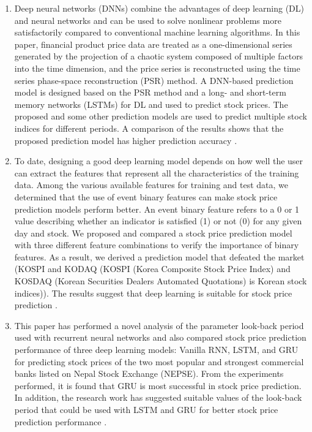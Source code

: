 \documentclass[12pt,journal,compsoc]{IEEEtran}
\begin{document}
\begin{enumerate}
	\item Deep neural networks (DNNs) combine the advantages of deep learning (DL) and neural networks and can be used to solve nonlinear problems more satisfactorily compared to conventional machine learning algorithms. In this paper, financial product price data are treated as a one-dimensional series generated by the projection of a chaotic system composed of multiple factors into the time dimension, and the price series is reconstructed using the time series phase-space reconstruction (PSR) method. A DNN-based prediction model is designed based on the PSR method and a long- and short-term memory networks (LSTMs) for DL and used to predict stock prices. The proposed and some other prediction models are used to predict multiple stock indices for different periods. A comparison of the results shows that the proposed prediction model has higher prediction accuracy \cite{yu2020stock}.
	
	\item To date, designing a good deep learning model depends on how well the user can extract the features that represent all the characteristics of the training data. Among the various available features for training and test data, we determined that the use of event binary features can make stock price prediction models perform better. An event binary feature refers to a 0 or 1 value describing whether an indicator is satisfied (1) or not (0) for any given day and stock. We proposed and compared a stock price prediction model with three different feature combinations to verify the importance of binary features. As a result, we derived a prediction model that defeated the market (KOSPI and KODAQ (KOSPI (Korea Composite Stock Price Index) and KOSDAQ (Korean Securities Dealers Automated Quotations) is Korean stock indices)). The results suggest that deep learning is suitable for stock price prediction \cite{song2020importance}.
	
	\item This paper has performed a novel analysis of the parameter look-back period used with recurrent neural networks and also compared stock price prediction performance of three deep learning models: Vanilla RNN, LSTM, and GRU for predicting stock prices of the two most popular and strongest commercial banks listed on Nepal Stock Exchange (NEPSE). From the experiments performed, it is found that GRU is most successful in stock price prediction. In addition, the research work has suggested suitable values of the look-back period that could be used with LSTM and GRU for better stock price prediction performance \cite{saud2020analysis}.
	

\end{enumerate}
\end{document}
